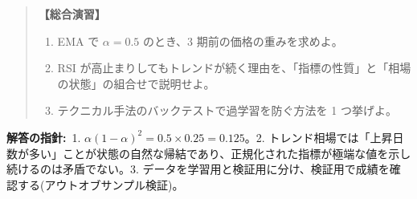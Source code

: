 \documentclass{article}
\begin{document}
\begin{quote}
\textbf{【総合演習】}
\begin{enumerate}
\item EMA で \(\alpha = 0.5\) のとき、3 期前の価格の重みを求めよ。
\item RSI が高止まりしてもトレンドが続く理由を、「指標の性質」と「相場の状態」の組合せで説明せよ。
\item テクニカル手法のバックテストで過学習を防ぐ方法を 1 つ挙げよ。
\end{enumerate}
\end{quote}

\textbf{解答の指針:}\ 1. \(\alpha(1-\alpha)^2 = 0.5 \times 0.25 = 0.125\)。2. トレンド相場では「上昇日数が多い」ことが状態の自然な帰結であり、正規化された指標が極端な値を示し続けるのは矛盾でない。3. データを学習用と検証用に分け、検証用で成績を確認する(アウトオブサンプル検証)。
\end{document}
